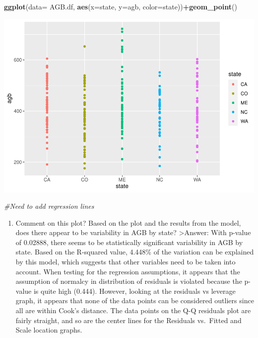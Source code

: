\documentclass[
]{article}
\newenvironment{Shaded}{\begin{snugshade}}{\end{snugshade}}
\newcommand{\AttributeTok}[1]{\textcolor[rgb]{0.13,0.29,0.53}{#1}}
\newcommand{\CommentTok}[1]{\textcolor[rgb]{0.56,0.35,0.01}{\textit{#1}}}
\newcommand{\FunctionTok}[1]{\textcolor[rgb]{0.13,0.29,0.53}{\textbf{#1}}}
\newcommand{\NormalTok}[1]{#1}
\newcommand{\SpecialCharTok}[1]{\textcolor[rgb]{0.81,0.36,0.00}{\textbf{#1}}}
\providecommand{\tightlist}{%
  \setlength{\itemsep}{0pt}\setlength{\parskip}{0pt}}
\begin{document}
\begin{Shaded}
\begin{Highlighting}[]
\FunctionTok{ggplot}\NormalTok{(}\AttributeTok{data=}\NormalTok{ AGB.df, }\FunctionTok{aes}\NormalTok{(}\AttributeTok{x=}\NormalTok{state, }\AttributeTok{y=}\NormalTok{agb, }\AttributeTok{color=}\NormalTok{state))}\SpecialCharTok{+}\FunctionTok{geom\_point}\NormalTok{()}
\end{Highlighting}
\end{Shaded}

\includegraphics{Stats-Lab-7_files/figure-latex/unnamed-chunk-15-1.pdf}

\begin{Shaded}
\begin{Highlighting}[]
\CommentTok{\#Need to add regression lines}
\end{Highlighting}
\end{Shaded}

\begin{enumerate}
\def\labelenumi{\alph{enumi}.}
\setcounter{enumi}{6}
\tightlist
\item
  Comment on this plot? Based on the plot and the results from the
  model, does there appear to be variability in AGB by state?
  \textgreater Answer: With p-value of 0.02888, there seems to be
  statistically significant variability in AGB by state. Based on the
  R-squared value, 4.448\% of the variation can be explained by this
  model, which suggests that other variables need to be taken into
  account. When testing for the regression assumptions, it appears that
  the assumption of normalcy in distribution of residuals is violated
  because the p-value is quite high (0.444). However, looking at the
  residuals vs leverage graph, it appears that none of the data points
  can be considered outliers since all are within Cook's distance. The
  data points on the Q-Q residuals plot are fairly straight, and so are
  the center lines for the Residuals vs.~Fitted and Scale location
  graphs.
\end{enumerate}
\end{document}
